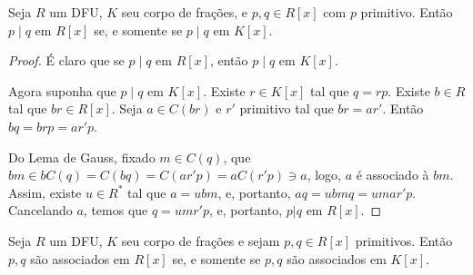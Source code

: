     \begin{prop}
        Seja $R$ um DFU, $K$ seu corpo de frações, e $p, q\in R[x]$ com $p$ primitivo. Então $p\mid q$ em $R[x]$ se, e somente se $p\mid q$ em $K[x]$.
    \end{prop}
    \begin{proof}
        É claro que se $p\mid q$ em $R[x]$, então $p\mid q$ em $K[x]$.

        Agora suponha que $p\mid q$ em $K[x]$. Existe $r \in K[x]$ tal que $q=rp$. Existe $b\in R$ tal que $br\in R[x]$. Seja $a \in C(br)$ e $r'$ primitivo tal que $br=ar'$. Então $bq=brp=ar'p$.

        Do Lema de Gauss, fixado $m \in C(q)$, que $bm\in bC(q)=C(bq)=C(ar'p)=aC(r'p)\ni a$, logo, $a$ é associado à $bm$. Assim, existe $u \in R^*$ tal que $a=ubm$, e, portanto, $aq=ubmq=umar'p$. Cancelando $a$, temos que $q=umr'p$, e, portanto, $p|q$ em $R[x]$.
    \end{proof}

    \begin{corol}
        Seja $R$ um DFU, $K$ seu corpo de frações e sejam $p, q \in R[x]$ primitivos.
        Então $p, q$ são associados em $R[x]$ se, e somente se $p, q$ são associados em $K[x]$. 
    \end{corol}

